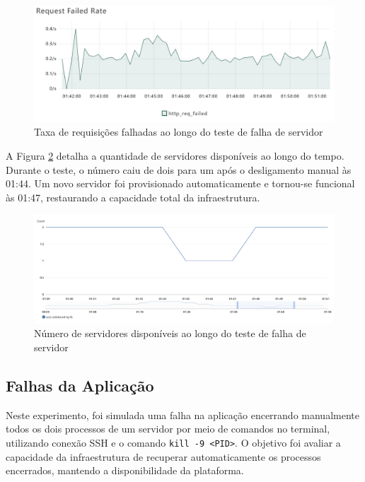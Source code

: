 \begin{figure}[H]
    \centering
    \includegraphics[width=1\textwidth]{assets/server-failing-test/req-failed-rate.png}
    \caption{Taxa de requisições falhadas ao longo do teste de falha de servidor}
    \label{fig:server-failing-req-failed-rate}
\end{figure}

A Figura \ref{fig:server-failing-healthy-hosts} detalha a quantidade de servidores disponíveis ao longo do tempo. Durante o teste, o número caiu de dois para um após o desligamento manual às 01:44. Um novo servidor foi provisionado automaticamente e tornou-se funcional às 01:47, restaurando a capacidade total da infraestrutura.

\begin{figure}[H]
    \centering
    \includegraphics[width=1\textwidth]{assets/server-failing-test/healthy-hosts.png}
    \caption{Número de servidores disponíveis ao longo do teste de falha de servidor}
    \label{fig:server-failing-healthy-hosts}
\end{figure}

\subsection{Falhas da Aplicação}

Neste experimento, foi simulada uma falha na aplicação encerrando manualmente todos os dois processos de um servidor por meio de comandos no terminal, utilizando conexão SSH e o comando \texttt{kill -9 <PID>}. O objetivo foi avaliar a capacidade da infraestrutura de recuperar automaticamente os processos encerrados, mantendo a disponibilidade da plataforma.

